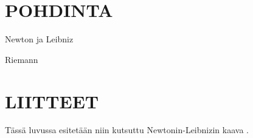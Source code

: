 \section{POHDINTA}
\lipsum[1-10]


 
\begin{thebibliography}{99}

 Newton ja Leibniz

 Riemann

\end{thebibliography}

\section{LIITTEET}

Tässä luvussa esitetään niin kutsuttu Newtonin-Leibnizin kaava \cite{NewtLeib}.


